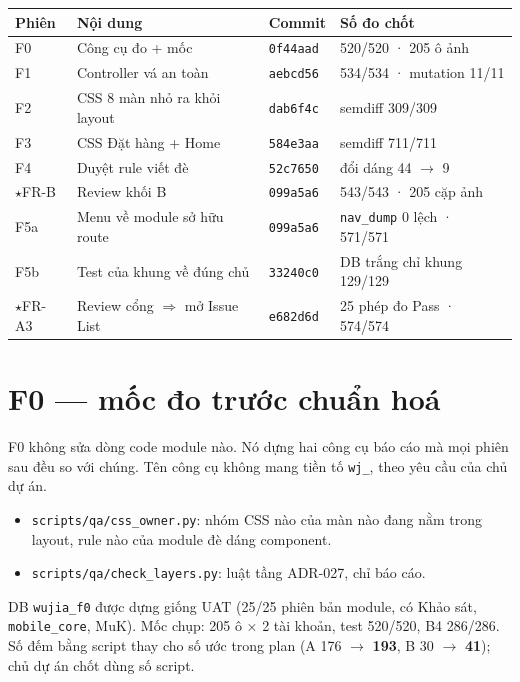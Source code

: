 \begin{center}
\small
\begin{tabular}{llll}
\toprule
Phiên & Nội dung & Commit & Số đo chốt \\
\midrule
F0 & Công cụ đo + mốc & \texttt{0f44aad} & 520/520 · 205 ô ảnh \\
F1 & Controller vá an toàn & \texttt{aebcd56} & 534/534 · mutation 11/11 \\
F2 & CSS 8 màn nhỏ ra khỏi layout & \texttt{dab6f4c} & semdiff 309/309 \\
F3 & CSS Đặt hàng + Home & \texttt{584e3aa} & semdiff 711/711 \\
F4 & Duyệt rule viết đè & \texttt{52c7650} & đổi dáng 44 $\to$ 9 \\
$\star$FR-B & Review khối B & \texttt{099a5a6} & 543/543 · 205 cặp ảnh \\
F5a & Menu về module sở hữu route & \texttt{099a5a6} & \texttt{nav\_dump} 0 lệch · 571/571 \\
F5b & Test của khung về đúng chủ & \texttt{33240c0} & DB trắng chỉ khung 129/129 \\
$\star$FR-A3 & Review cổng $\Rightarrow$ mở Issue List & \texttt{e682d6d} & 25 phép đo Pass · 574/574 \\
\bottomrule
\end{tabular}
\end{center}

\section{F0 --- mốc đo trước chuẩn hoá}

F0 không sửa dòng code module nào. Nó dựng hai công cụ báo cáo mà mọi phiên sau đều so với chúng.
Tên công cụ không mang tiền tố \texttt{wj\_}, theo yêu cầu của chủ dự án.
\begin{itemize}[nosep]
\item \texttt{scripts/qa/css\_owner.py}: nhóm CSS nào của màn nào đang nằm trong layout, rule nào của
  module đè dáng component.
\item \texttt{scripts/qa/check\_layers.py}: luật tầng ADR-027, chỉ báo cáo.
\end{itemize}
DB \texttt{wujia\_f0} được dựng giống UAT (25/25 phiên bản module, có Khảo sát, \texttt{mobile\_core}, MuK). Mốc
chụp: 205 ô × 2 tài khoản, test 520/520, B4 286/286. Số đếm bằng script thay cho số ước trong plan
(A 176 $\to$ \textbf{193}, B 30 $\to$ \textbf{41}); chủ dự án chốt dùng số script.

